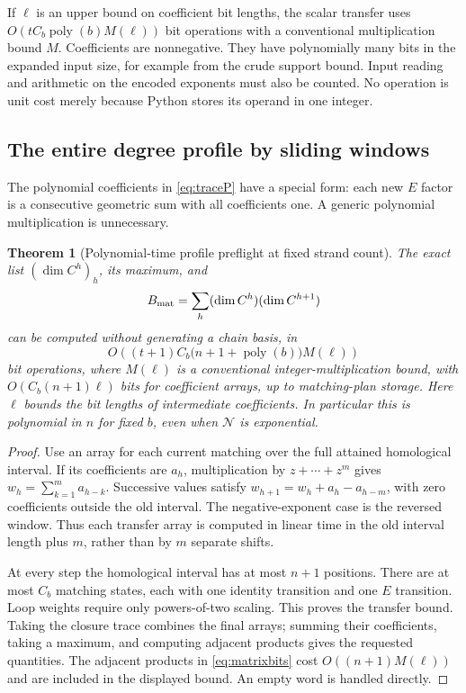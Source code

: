 \documentclass[11pt,letterpaper]{article}
\newtheorem{theorem}{Theorem}[section]
\theoremstyle{definition}
\newcommand{\poly}{\operatorname{poly}}
\newcommand{\N}{\mathcal N}
\begin{document}
If \(\ell\) is an upper bound on coefficient bit lengths, the scalar transfer uses
\(O(tC_b\poly(b)M(\ell))\) bit operations with a conventional multiplication bound \(M\). Coefficients are nonnegative. They have polynomially many bits in the expanded input size, for example from the crude support bound. Input reading and arithmetic on the encoded exponents must also be counted. No operation is unit cost merely because Python stores its operand in one integer.

\subsection{The entire degree profile by sliding windows}
The polynomial coefficients in \cref{eq:traceP} have a special form: each new \(E\) factor is a consecutive geometric sum with all coefficients one. A generic polynomial multiplication is unnecessary.

\begin{theorem}[Polynomial-time profile preflight at fixed strand count]\label{thm:profile}
The exact list \((\dim C^h)_h\), its maximum, and
\begin{equation}\label{eq:matrixbits}
 B_{\rm mat}=\sum_h(\dim C^h)(\dim C^{h+1})
\end{equation}
can be computed without generating a chain basis, in
\[
 O\!\left((t+1) C_b\bigl(n+1+\poly(b)\bigr)M(\ell)\right)
\]
bit operations, where $M(\ell)$ is a conventional integer-multiplication bound, with \(O(C_b(n+1)\ell)\) bits for coefficient arrays, up to matching-plan storage. Here \(\ell\) bounds the bit lengths of intermediate coefficients. In particular this is polynomial in \(n\) for fixed \(b\), even when \(\N\) is exponential.
\end{theorem}
\begin{proof}
Use an array for each current matching over the full attained homological interval. If its coefficients are \(a_h\), multiplication by
\(z+\cdots+z^m\) gives
\(w_h=\sum_{k=1}^m a_{h-k}\).
Successive values satisfy
\(w_{h+1}=w_h+a_h-a_{h-m}\), with zero coefficients outside the old interval. The negative-exponent case is the reversed window. Thus each transfer array is computed in linear time in the old interval length plus \(m\), rather than by \(m\) separate shifts.

At every step the homological interval has at most \(n+1\) positions. There are at most \(C_b\) matching states, each with one identity transition and one \(E\) transition. Loop weights require only powers-of-two scaling. This proves the transfer bound. Taking the closure trace combines the final arrays; summing their coefficients, taking a maximum, and computing adjacent products gives the requested quantities. The adjacent products in \cref{eq:matrixbits} cost $O((n+1)M(\ell))$ and are included in the displayed bound. An empty word is handled directly.
\end{proof}
\end{document}
